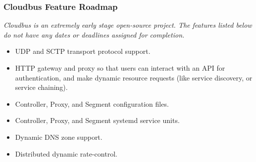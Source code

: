 \begin{frame}
	\frametitle{Cloudbus Feature Roadmap}
	\emph{Cloudbus is an extremely early stage open-source project. The features listed below do not have any dates or deadlines assigned for 
	completion.}\vspace{1em}
	\small
	\begin{itemize}
		\item UDP and SCTP transport protocol support.
		\item HTTP gateway and proxy so that users can interact with an API for authentication, and make dynamic resource requests (like service %
		discovery, or service chaining).
		\item Controller, Proxy, and Segment configuration files.
		\item Controller, Proxy, and Segment systemd service units.
		\item Dynamic DNS zone support.
		\item Distributed dynamic rate-control.
	\end{itemize}
\end{frame}
